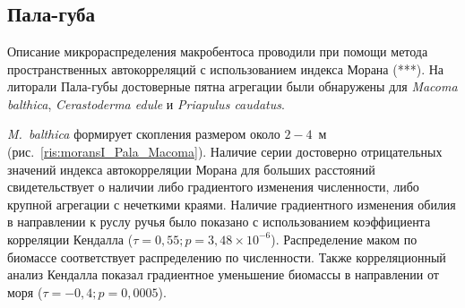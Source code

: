 \documentclass[12pt, a4paper]{disser}
\begin{document}
\section*{}	
	\subsection{Пала-губа}
Описание микрораспределения макробентоса проводили при помощи метода пространственных автокорреляций с использованием индекса Морана (***).
На литорали Пала-губы достоверные пятна агрегации были обнаружены для {\it Macoma balthica}, {\it Cerastoderma edule} и {\it Priapulus caudatus}. 

{\it M.~balthica} формирует скопления размером около $2-4$~м (рис.~\ref{ris:moransI_Pala_Macoma}). 
Наличие серии достоверно отрицательных значений индекса автокорреляции Морана для больших расстояний свидетельствует о наличии либо градиентого изменения численности, либо крупной агрегации с нечеткими краями.
Наличие градиентного изменения обилия в направлении к руслу ручья было показано с использованием коэффициента корреляции Кендалла ($\tau = 0,55; p = 3,48 \times 10^{-6}$).
Распределение маком по биомассе соответствует распределению по численности. Также корреляционный анализ Кендалла показал градиентное уменьшение биомассы в направлении от моря ($\tau = -0,4; p = 0,0005$).
\end{document}
